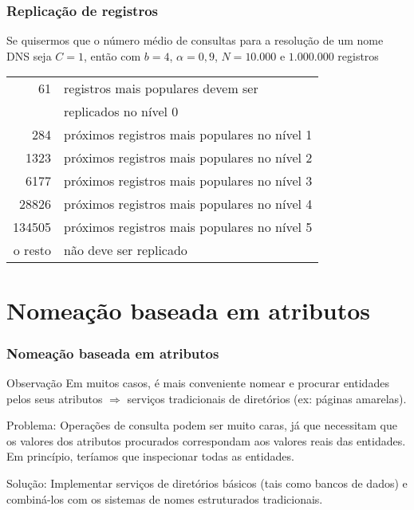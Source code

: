 \documentclass[Ligatures=TeX,table,brazil,svgnames,usetotalslideindicator,compress,10pt]{beamer}
\begin{document}
\begin{frame}
  \frametitle{Replicação de registros}
  \begin{block}{}
    Se quisermos que o número médio de consultas para a resolução de um nome DNS seja $C=1$, então com $b=4$, $\alpha=0,9$, $N = 10.000$ e $1.000.000$ registros

    \begin{center}
      \begin{tabular}{r@{\ }l}
        61 & registros mais populares devem ser \\ & replicados no nível 0 \\
        284 & próximos registros mais populares no nível  1 \\
        1323 & próximos registros mais populares no nível 2 \\
        6177 & próximos registros mais populares no nível 3 \\
        28826 & próximos registros mais populares no nível 4 \\
        134505 & próximos registros mais populares no nível 5 \\
        o resto & não deve ser replicado
      \end{tabular}
    \end{center}

  \end{block}
\end{frame}

\section{Nomeação baseada em atributos}

\begin{frame}
  \frametitle{Nomeação baseada em atributos}
  \begin{block}{Observação}
    Em muitos casos, é mais conveniente nomear e procurar entidades pelos seus \alert{atributos} $\Rightarrow$ serviços tradicionais de diretórios (ex: páginas amarelas).
  \end{block}

  \pause
  \begin{alertblock}{Problema:}
    Operações de consulta podem ser muito caras, já que necessitam que os valores dos atributos procurados correspondam aos valores reais das entidades. Em princípio, teríamos que inspecionar todas as entidades.
  \end{alertblock}

  \pause
  \begin{block}{Solução:}
    Implementar serviços de diretórios básicos (tais como bancos de dados) e combiná-los com os sistemas de nomes estruturados tradicionais.
  \end{block}
\end{frame}
\end{document}
